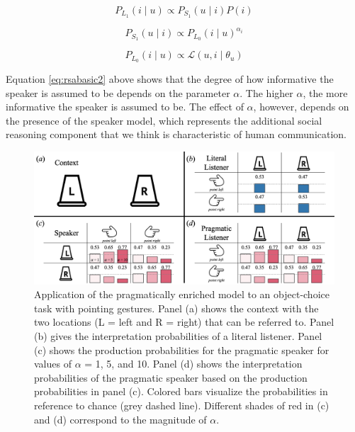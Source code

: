 \documentclass[
  english,
  man,floatsintext]{apa6}
\begin{document}
\begin{equation}
P_{L_1}(i \mid u)\propto P_{S_1}(u \mid i) P(i)
\label{eq:rsabasic1}
\end{equation}

\begin{equation}
P_{S_1}(u \mid i)\propto P_{L_0}(i\mid u) ^{\alpha_i}
\label{eq:rsabasic2}
\end{equation}

\begin{equation}
P_{L_0}(i\mid u) \propto \mathcal{L}(u, i \mid \theta_{u})
\label{eq:rsabasic3}
\end{equation}

Equation \eqref{eq:rsabasic2} above shows that the degree of how informative the speaker is assumed to be depends on the parameter \(\alpha\). The higher \(\alpha\), the more informative the speaker is assumed to be. The effect of \(\alpha\), however, depends on the presence of the speaker model, which represents the additional social reasoning component that we think is characteristic of human communication.



\begin{figure}

{\centering \includegraphics[width=1\linewidth]{../graphs/Fig2} 

}

\caption{Application of the pragmatically enriched model to an object-choice task with pointing gestures. Panel (a) shows the context with the two locations (L = left and R = right) that can be referred to. Panel (b) gives the interpretation probabilities of a literal listener. Panel (c) shows the production probabilities for the pragmatic speaker for values of \(\alpha\) = 1, 5, and 10. Panel (d) shows the interpretation probabilities of the pragmatic speaker based on the production probabilities in panel (c). Colored bars visualize the probabilities in reference to chance (grey dashed line). Different shades of red in (c) and (d) correspond to the magnitude of \(\alpha\).}\label{fig:fig2}
\end{figure}
\end{document}
